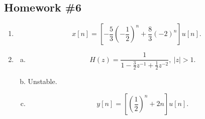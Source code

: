 \documentclass{article}
\begin{document}
    \subsection*{Homework \#6}
        \begin{enumerate}
            \item \[
                x[n] = \left[ -\frac{5}{3}\left( -\frac{1}{2}\right)^{n} + \frac{8}{3} (-2)^{n} \right] u[n].
            \]
            
            \item 
            \begin{enumerate}[(a)]
                \item \[
                    H(z) = \frac{1}{1-\frac{3}{2}z^{-1} + \frac{1}{2}z^{-2}},\ 
                    |z| > 1.
                \]
                \item Unstable.
                \item \[
                    y[n] = \left[ \left( \frac{1}{2}\right)^{n} + 2n\right] u[n].
                \]
            \end{enumerate}	
            

\end{enumerate}
\end{document}
